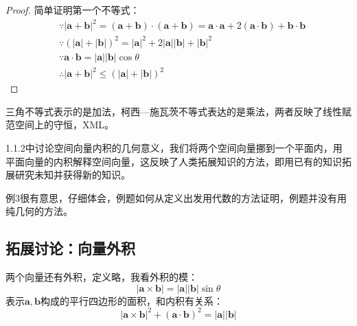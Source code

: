 \begin{proof}
简单证明第一个不等式：
\begin{align*}
&\because \left| \boldsymbol{a}+\boldsymbol{b} \right|^2=\left( \boldsymbol{a}+\boldsymbol{b} \right) \cdot \left( \boldsymbol{a}+\boldsymbol{b} \right) =\boldsymbol{a}\cdot \boldsymbol{a}+2\left( \boldsymbol{a}\cdot \boldsymbol{b} \right) +\boldsymbol{b}\cdot \boldsymbol{b} \\
&\because \left( \left| \boldsymbol{a} \right|+\left| \boldsymbol{b} \right| \right) ^2=\left| \boldsymbol{a} \right|^2+2\left| \boldsymbol{a} \right|\left| \boldsymbol{b} \right|+\left| \boldsymbol{b} \right|^2 \\
&\because \boldsymbol{a}\cdot \boldsymbol{b}=\left| \boldsymbol{a} \right|\left| \boldsymbol{b} \right|\cos \theta \\
&\therefore \left| \boldsymbol{a}+\boldsymbol{b} \right|^2\leqslant \left( \left| \boldsymbol{a} \right|+\left| \boldsymbol{b} \right| \right) ^2
\end{align*}
\end{proof}

\begin{tcolorbox}
三角不等式表示的是加法，柯西—施瓦茨不等式表达的是乘法，两者反映了线性赋范空间上的守恒，XML。
\end{tcolorbox}

\begin{tcolorbox}
1.1.2中讨论空间向量内积的几何意义，我们将两个空间向量挪到一个平面内，用平面向量的内积解释空间向量，这反映了人类拓展知识的方法，即用已有的知识拓展研究未知并获得新的知识。

例3很有意思，仔细体会，例题如何从定义出发用代数的方法证明，例题并没有用纯几何的方法。
\end{tcolorbox}

\subsection{拓展讨论：向量外积}

两个向量还有外积，定义略，我看外积的模：
\[
\left| \boldsymbol{a}\times \boldsymbol{b} \right|=\left| \boldsymbol{a} \right|\left| \boldsymbol{b} \right|\sin \theta
\]
表示$\boldsymbol{a},\boldsymbol{b}$构成的平行四边形的面积，和内积有关系：
\[
\left| \boldsymbol{a}\times \boldsymbol{b} \right|^2+\left( \boldsymbol{a}\cdot \boldsymbol{b} \right) ^2=\left| \boldsymbol{a} \right|\left| \boldsymbol{b} \right|
\]

